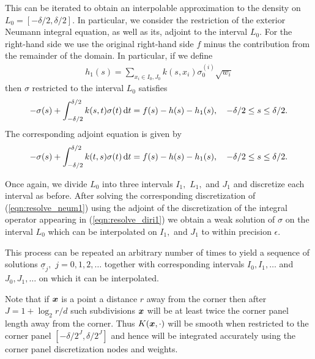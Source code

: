 This can be iterated to obtain an interpolable approximation to the density on $L_0 = [-\delta/2,\delta/2].$ In particular, we consider the restriction of the exterior Neumann integral equation, as well as its, adjoint to the interval $L_0.$ For the right-hand side we use the original right-hand side $f$ minus the contribution from the remainder of the domain. In particular, if we define
\begin{align}
h_1(s) = \sum_{x_i \in I_0,J_0} k(s,x_i) \sigma_0^{(i)} \sqrt{w_i}
\end{align}
then $\sigma$ restricted to the interval $L_0$ satisfies
\begin{align}\label{eqn:resolve_neum1}
-\sigma(s) + \int_{-\delta/2}^{\delta/2} k(s,t) \sigma(t)\,{\rm d} t = f(s)-h(s)-h_1(s), \quad -\delta/2 \le s \le \delta/2.
\end{align}
The corresponding adjoint equation is given by 
\begin{align}\label{eqn:resolve_diri1}
-\sigma(s) + \int_{-\delta/2}^{\delta/2} k(t,s) \sigma(t)\,{\rm d} t = f(s)-h(s)-h_1(s), \quad -\delta/2 \le s \le \delta/2.
\end{align}

Once again, we divide $L_0$ into three intervals $I_1,$ $L_1,$ and $J_1$ and discretize each interval as before. After solving the corresponding discretization of (\ref{eqn:resolve_neum1}) using the adjoint of the discretization of the integral operator appearing in (\ref{eqn:resolve_diri1}) we obtain a weak solution of $\sigma$ on the interval $L_0$ which can be interpolated on $I_1,$ and $J_1$ to within precision $\epsilon.$

This process can be repeated an arbitrary number of times to yield a sequence of solutions $\underline{\sigma}_j,$ $j=0,1,2,\dots$ together with corresponding intervals $I_0,I_1,\dots$ and $J_0,J_1,\dots$ on which it can be interpolated.

Note that if $\boldsymbol{x}$ is a point a distance $r$ away from the corner then after $J=1+\log_2 r/d$ such subdivisions $\boldsymbol{x}$ will be at least twice the corner panel length away from the corner. Thus $K(\boldsymbol{x},\cdot)$ will be smooth when restricted to the corner panel $[-\delta/2^{J},\delta/2^J]$ and hence will be integrated accurately using the corner panel discretization nodes and weights.
